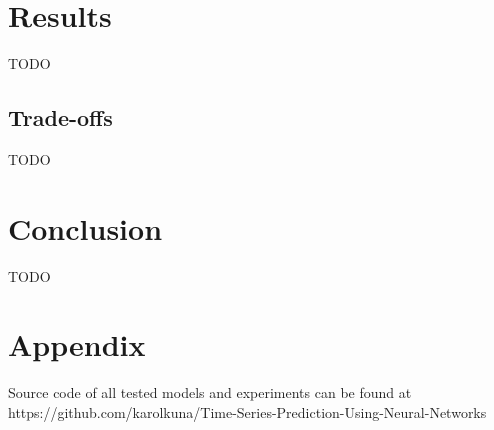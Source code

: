 \documentclass[12pt,oneside]{fithesis2}
\begin{document}
\chapter{Results}
TODO
\section{Trade-offs}
TODO

\chapter{Conclusion}
TODO


    \appendix
    \chapter{Appendix}
    Source code of all tested models and experiments can be found at https://github.com/karolkuna/Time-Series-Prediction-Using-Neural-Networks
    
	
	
    
\end{document}
